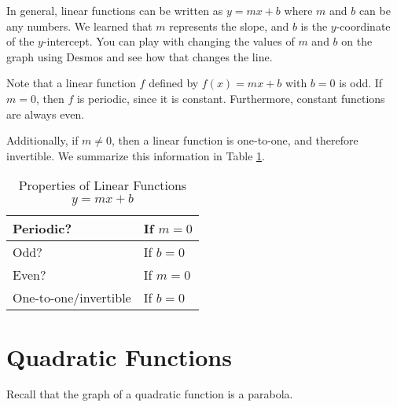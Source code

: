 \documentclass[nooutcomes]{ximera}
\begin{document}
In general, linear functions can be written as $y=mx+b$ where $m$ and $b$ can be any numbers. We learned that $m$ represents the slope, and $b$ is the $y$-coordinate of the $y$-intercept. You can play with changing the values of $m$ and $b$ on the graph using Desmos and see how that changes the line.  

\begin{center}  
\end{center}

Note that a linear function $f$ defined by $f(x) = mx + b$ with $b = 0$ is odd. If $m = 0$, then $f$ is periodic, since it is constant. Furthermore, constant functions are always even.

Additionally, if $m \ne 0$, then a linear function is one-to-one, and therefore invertible. We summarize this information in Table \ref{tab:linearproperties}.

\begin{table}[h]
\caption{\label{tab:linearproperties}Properties of Linear Functions $y = mx + b$}
\centering
\begin{tabular}{l|l}
Periodic? & If $m = 0$ \\ \hline
Odd? & If $b = 0$ \\ \hline
Even? & If $m = 0$ \\ \hline
One-to-one/invertible & If $b = 0$  
\end{tabular}
\end{table}

\newpage


\section{Quadratic Functions}

Recall that the graph of a quadratic function is a parabola.
\end{document}
